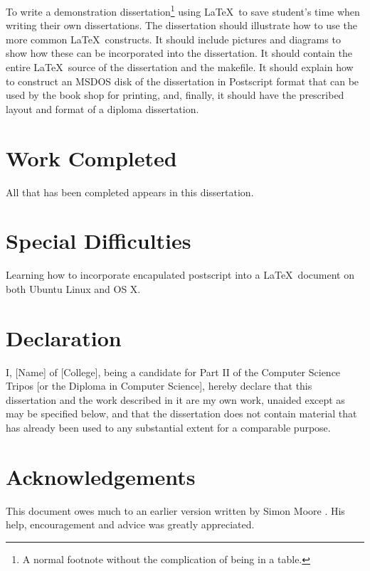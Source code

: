 \documentclass[12pt,a4paper,twoside,openright]{report}
\begin{document}
To write a demonstration dissertation\footnote{A normal footnote without the
complication of being in a table.} using \LaTeX\ to save
student's time when writing their own dissertations. The dissertation
should illustrate how to use the more common \LaTeX\ constructs. It
should include pictures and diagrams to show how these can be
incorporated into the dissertation.  It should contain the entire
\LaTeX\ source of the dissertation and the makefile.  It should
explain how to construct an MSDOS disk of the dissertation in
Postscript format that can be used by the book shop for printing, and,
finally, it should have the prescribed layout and format of a diploma
dissertation.


\section*{Work Completed}

All that has been completed appears in this dissertation.

\section*{Special Difficulties}

Learning how to incorporate encapulated postscript into a \LaTeX\
document on both Ubuntu Linux and OS X.
 
\newpage
\section*{Declaration}

I, [Name] of [College], being a candidate for Part II of the Computer
Science Tripos [or the Diploma in Computer Science], hereby declare
that this dissertation and the work described in it are my own work,
unaided except as may be specified below, and that the dissertation
does not contain material that has already been used to any substantial
extent for a comparable purpose.

\bigskip
{}

\medskip
{}

\tableofcontents

\listoffigures

\newpage
\section*{Acknowledgements}

This document owes much to an earlier version written by Simon Moore
\cite{Moore95}.  His help, encouragement and advice was greatly 
appreciated.
\end{document}
